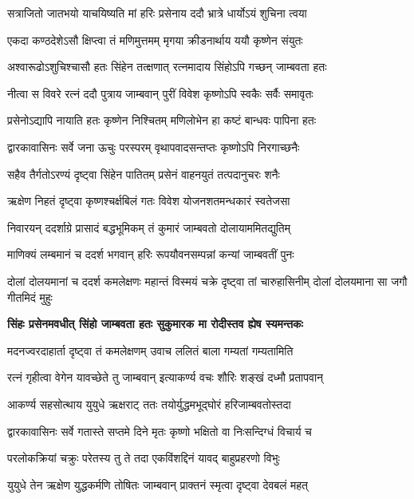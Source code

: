 \begin{center}
\twolineshloka
{सत्राजितो जातभयो याचयिष्यति मां हरिः}
{प्रसेनाय ददौ भ्रात्रे धार्योऽयं शुचिना त्वया}%

\twolineshloka
{एकदा कण्ठदेशेऽसौ क्षिप्त्वा तं मणिमुत्तमम्}
{मृगया क्रीडनार्थाय ययौ कृष्णेन संयुतः}%

\twolineshloka
{अश्वारूढोऽशुचिश्चासौ हतः सिंहेन तत्क्षणात्}
{रत्नमादाय सिंहोऽपि गच्छन् जाम्बवता हतः}%

\twolineshloka
{नीत्वा स विवरे रत्नं ददौ पुत्राय जाम्बवान्}
{पुरीं विवेश कृष्णोऽपि स्वकैः सर्वैः समावृतः}%

\twolineshloka
{प्रसेनोऽद्यापि नायाति हतः कृष्णेन निश्चितम्}
{मणिलोभेन हा कष्टं बान्धवः पापिना हतः}%

\twolineshloka
{द्वारकावासिनः सर्वे जना ऊचुः परस्परम्}
{वृथापवादसन्तप्तः कृष्णोऽपि निरगाच्छनैः}%

\twolineshloka
{सहैव तैर्गतोऽरण्यं दृष्ट्वा सिंहेन पातितम्}
{प्रसेनं वाहनयुतं तत्पदानुचरः शनैः}%

\twolineshloka
{ऋक्षेण निहतं दृष्ट्वा कृष्णश्चर्क्षबिलं गतः}
{विवेश योजनशतमन्धकारं स्वतेजसा}%

\twolineshloka
{निवारयन् ददर्शाग्रे प्रासादं बद्धभूमिकम्}
{तं कुमारं जाम्बवतो दोलायाममितद्युतिम्}%

\twolineshloka
{माणिक्यं लम्बमानं च ददर्श भगवान् हरिः}
{रूपयौवनसम्पन्नां कन्यां जाम्बवतीं पुनः}%

\threelineshloka
{दोलां दोलयमानां च ददर्श कमलेक्षणः}
{महान्तं विस्मयं चक्रे दृष्ट्वा तां चारुहासिनीम्}
{दोलां दोलयमाना सा जगौ गीतमिदं मुहुः}%

\begingroup
\bfseries
\twolineshloka
{सिंहः प्रसेनमवधीत् सिंहो जाम्बवता हतः}
{सुकुमारक मा रोदीस्तव ह्येष स्यमन्तकः}%
\endgroup

\twolineshloka
{मदनज्वरदाहार्ता दृष्ट्वा तं कमलेक्षणम्}
{उवाच ललितं बाला गम्यतां गम्यतामिति}%

\twolineshloka
{रत्नं गृहीत्वा वेगेन यावच्छेते तु जाम्बवान्}
{इत्याकर्ण्य वचः शौरिः शङ्खं दध्मौ प्रतापवान्}%

\twolineshloka
{आकर्ण्य सहसोत्थाय युयुधे ऋक्षराट् ततः}
{तयोर्युद्धमभूद्घोरं हरिजाम्बवतोस्तदा}%

\twolineshloka
{द्वारकावासिनः सर्वे गतास्ते सप्तमे दिने}
{मृतः कृष्णो भक्षितो वा निःसन्दिग्धं विचार्य च}%

\twolineshloka
{परलोकक्रियां चक्रुः परेतस्य तु ते तदा}
{एकविंशद्दिनं यावद् बाहुप्रहरणो विभुः}%

\twolineshloka
{युयुधे तेन ऋक्षेण युद्धकर्मणि तोषितः}
{जाम्बवान् प्राक्तनं स्मृत्वा दृष्ट्वा देवबलं महत्}%


\end{center}
